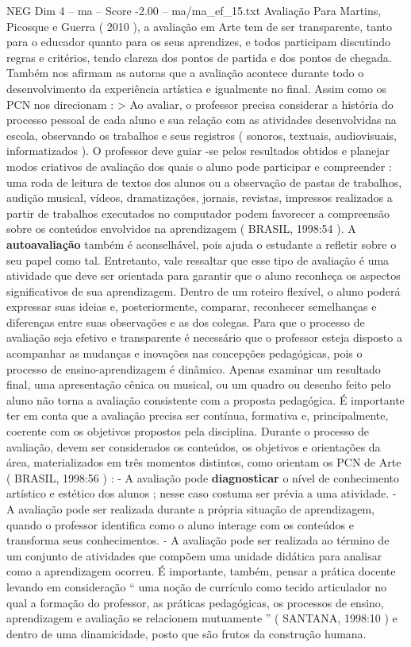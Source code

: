 \begin{textsample}{NEG Dim 4 – ma – Score -2.00 – ma/ma\_ef\_15.txt}  \label{ex:f4_neg_236}
Avaliação Para Martins, Picosque e Guerra ( 2010 ), a avaliação em Arte tem de ser transparente, tanto para o educador quanto para os seus aprendizes, e todos participam discutindo regras e critérios, tendo clareza dos pontos de partida e dos pontos de chegada.
Também nos afirmam as autoras que a avaliação acontece durante todo o desenvolvimento da experiência artística e igualmente no final.
Assim como os PCN nos direcionam : > Ao avaliar, o professor precisa considerar a história do processo pessoal de cada aluno e sua relação com as atividades desenvolvidas na escola, observando os trabalhos e seus registros ( sonoros, textuais, audiovisuais, informatizados ).
O professor deve guiar -se pelos resultados obtidos e planejar modos criativos de avaliação dos quais o aluno pode participar e compreender : uma roda de leitura de textos dos alunos ou a observação de pastas de trabalhos, audição musical, vídeos, dramatizações, jornais, revistas, impressos realizados a partir de trabalhos executados no computador podem favorecer a compreensão sobre os conteúdos envolvidos na aprendizagem ( BRASIL, 1998:54 ).
A \textbf{autoavaliação} também é aconselhável, pois ajuda o estudante a refletir sobre o seu papel como tal.
Entretanto, vale ressaltar que esse tipo de avaliação é uma atividade que deve ser orientada para garantir que o aluno reconheça os aspectos significativos de sua aprendizagem.
Dentro de um roteiro flexível, o aluno poderá expressar suas ideias e, posteriormente, comparar, reconhecer semelhanças e diferenças entre suas observações e as dos colegas.
Para que o processo de avaliação seja efetivo e transparente é necessário que o professor esteja disposto a acompanhar as mudanças e inovações nas concepções pedagógicas, pois o processo de ensino-aprendizagem é dinâmico.
Apenas examinar um resultado final, uma apresentação cênica ou musical, ou um quadro ou desenho feito pelo aluno não torna a avaliação consistente com a proposta pedagógica.
É importante ter em conta que a avaliação precisa ser contínua, formativa e, principalmente, coerente com os objetivos propostos pela disciplina.
Durante o processo de avaliação, devem ser considerados os conteúdos, os objetivos e orientações da área, materializados em três momentos distintos, como orientam os PCN de Arte ( BRASIL, 1998:56 ) : - A avaliação pode \textbf{diagnosticar} o nível de conhecimento artístico e estético dos alunos ; nesse caso costuma ser prévia a uma atividade. - A avaliação pode ser realizada durante a própria situação de aprendizagem, quando o professor identifica como o aluno interage com os conteúdos e transforma seus conhecimentos. - A avaliação pode ser realizada ao término de um conjunto de atividades que compõem uma unidade didática para analisar como a aprendizagem ocorreu.
É importante, também, pensar a prática docente levando em consideração “ uma noção de currículo como tecido articulador no qual a formação do professor, as práticas pedagógicas, os processos de ensino, aprendizagem e avaliação se relacionem mutuamente ” ( SANTANA, 1998:10 ) e dentro de uma dinamicidade, posto que são frutos da construção humana.

\end{textsample}
